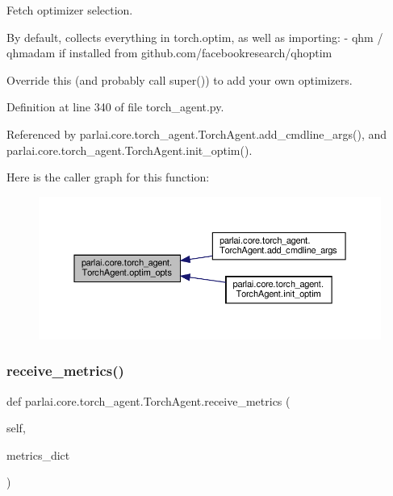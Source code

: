 \begin{DoxyVerb}Fetch optimizer selection.

By default, collects everything in torch.optim, as well as importing:
- qhm / qhmadam if installed from github.com/facebookresearch/qhoptim

Override this (and probably call super()) to add your own optimizers.
\end{DoxyVerb}
 

Definition at line 340 of file torch\+\_\+agent.\+py.



Referenced by parlai.\+core.\+torch\+\_\+agent.\+Torch\+Agent.\+add\+\_\+cmdline\+\_\+args(), and parlai.\+core.\+torch\+\_\+agent.\+Torch\+Agent.\+init\+\_\+optim().

Here is the caller graph for this function\+:
\nopagebreak
\begin{figure}[H]
\begin{center}
\leavevmode
\includegraphics[width=350pt]{classparlai_1_1core_1_1torch__agent_1_1TorchAgent_a9c622b8ed5a811841f30fe98cc297cde_icgraph}
\end{center}
\end{figure}
\mbox{\label{classparlai_1_1core_1_1torch__agent_1_1TorchAgent_a02beaaedfa30463f9d0a97ea590b516f}} 
\subsubsection{\texorpdfstring{receive\+\_\+metrics()}{receive\_metrics()}}
{\footnotesize\ttfamily def parlai.\+core.\+torch\+\_\+agent.\+Torch\+Agent.\+receive\+\_\+metrics (\begin{DoxyParamCaption}\item[{}]{self,  }\item[{}]{metrics\+\_\+dict }\end{DoxyParamCaption})}

